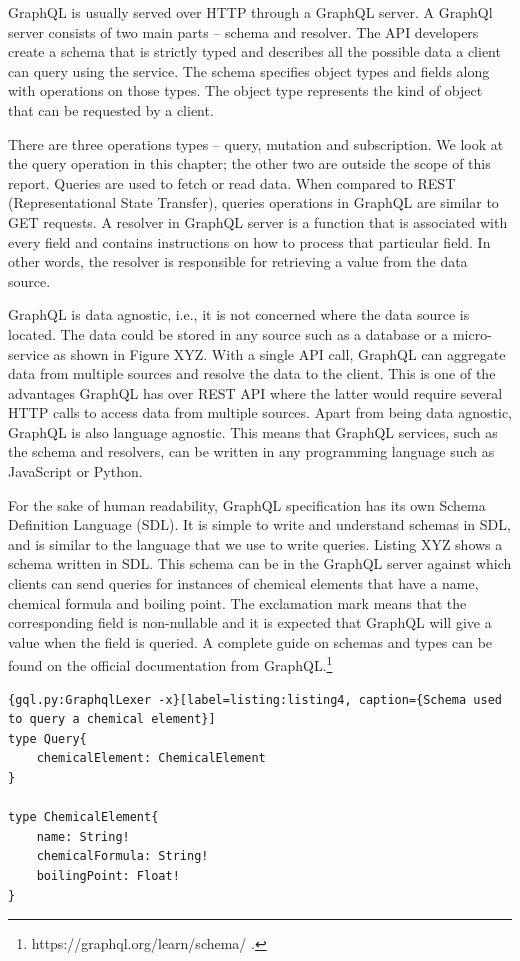 GraphQL is usually served over HTTP through a GraphQL server. A GraphQl server consists of two main parts – schema and resolver. The API developers create a schema that is strictly typed and describes all the possible data a client can query using the service. The schema specifies object types and fields along with operations on those types. The object type represents the kind of object that can be requested by a client. 

There are three operations types – query, mutation and subscription.  We look at the query operation in this chapter; the other two are outside the scope of this report. Queries are used to fetch or read data. When compared to REST (Representational State Transfer),  queries operations in GraphQL are similar to GET requests. A resolver in GraphQL server is a function that is associated with every field and contains instructions on how to process that particular field. In other words, the resolver is responsible for retrieving a value from the data source. 

GraphQL is data agnostic, i.e., it is not concerned where the data source is located. The data could be stored in any source such as a database or a micro-service as shown in Figure XYZ. With a single API call, GraphQL can aggregate data from multiple sources and resolve the data to the client. This is one of the advantages GraphQL has over REST API where the latter would require several HTTP calls to access data from multiple sources. Apart from being data agnostic, GraphQL is also language agnostic. This means that GraphQL services, such as the schema and resolvers, can be written in any programming language such as JavaScript or Python. 

For the sake of human readability, GraphQL specification has its own Schema Definition Language (SDL). It is simple to write and understand schemas in SDL, and is similar to the language that we use to write queries. Listing XYZ shows a schema written in SDL. This schema can be in the GraphQL server against which clients can send queries for instances of chemical elements that have a name, chemical formula and boiling point. The exclamation mark means that the corresponding field is non-nullable and it is expected that GraphQL will give a value when the field is queried. A complete guide on schemas and types can be found on the official documentation from GraphQL.\footnote{https://graphql.org/learn/schema/ .} 

\begin{minipage}{\linewidth}
\begin{lstlisting}{gql.py:GraphqlLexer -x}[label=listing:listing4, caption={Schema used to query a chemical element}]
type Query{
	chemicalElement: ChemicalElement
}

type ChemicalElement{
	name: String!
	chemicalFormula: String!
	boilingPoint: Float!
}

\end{lstlisting}
\end{minipage}

